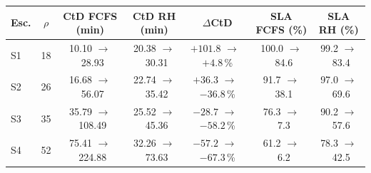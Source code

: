 \documentclass[11pt,letterpaper]{article}
\newcommand{\ra}{$\to$}
\begin{document}
{\small
\begin{longtable}{@{}l c c c c c c@{}}
\toprule
Esc. & $\rho$ & CtD FCFS (min) & CtD RH (min) & $\Delta$CtD & SLA FCFS (\%) & SLA RH (\%)\\
\midrule
S1 & 18 & 10.10 \ra\ 28.93  & 20.38 \ra\ 30.31 & $+101.8$ \ra\ $+4.8$\,\%  & 100.0 \ra\ 84.6 & 99.2 \ra\ 83.4\\
S2 & 26 & 16.68 \ra\ 56.07  & 22.74 \ra\ 35.42 & $+36.3$ \ra\ $-36.8$\,\%  & 91.7 \ra\ 38.1  & 97.0 \ra\ 69.6\\
S3 & 35 & 35.79 \ra\ 108.49 & 25.52 \ra\ 45.36 & $-28.7$ \ra\ $-58.2$\,\%  & 76.3 \ra\ 7.3   & 90.2 \ra\ 57.6\\
S4 & 52 & 75.41 \ra\ 224.88 & 32.26 \ra\ 73.63 & $-57.2$ \ra\ $-67.3$\,\%  & 61.2 \ra\ 6.2   & 78.3 \ra\ 42.5\\
\bottomrule
\end{longtable}}
\end{document}
